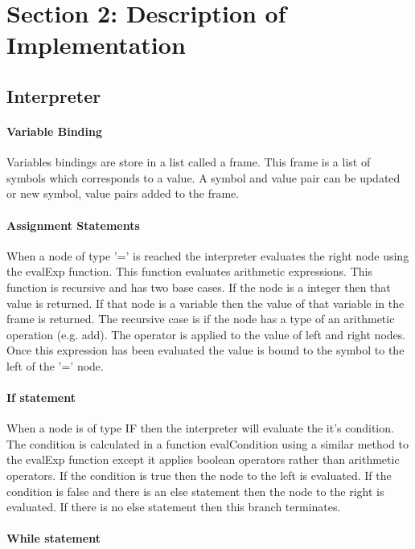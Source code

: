 \documentclass{article}
\begin{document}
	
	\section{Section 2: Description of Implementation}
	
	\subsection{Interpreter}
	
	\paragraph{Variable Binding}
	
	Variables bindings are store in a list called a frame. This frame is a list of symbols which corresponds to a value. A symbol and value pair can be updated or new symbol, value pairs added to the frame. 
	
	\paragraph{Assignment Statements}
	
	When a node of type '=' is reached the interpreter evaluates the right node using the evalExp function. This function evaluates arithmetic expressions. This function is recursive and has two base cases. If the node is a integer then that value is returned. If that node is a variable then the value of that variable in the frame is returned. The recursive case is if the node has a type of an arithmetic operation (e.g. add). The operator is applied to the value of left and right nodes. Once this expression has been evaluated the value is bound to the symbol to the left of the '=' node.
	
	\paragraph{If statement}
	
	When a node is of type IF then the interpreter will evaluate the it's condition. The condition is calculated in a function evalCondition using a similar method to the evalExp function except it applies boolean operators rather than arithmetic operators. If the condition is true then the node to the left is evaluated. If the condition is false and there is an else statement then the node to the right is evaluated. If there is no else statement then this branch terminates. 
	
	\paragraph{While statement}
	
\end{document}
